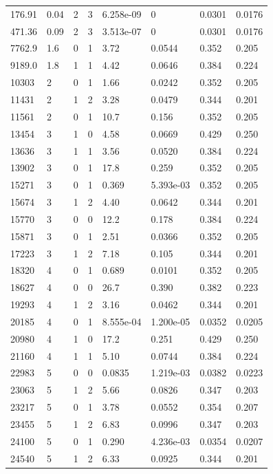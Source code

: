 \documentclass[preview]{standalone}
\begin{document}
{{\begin{tabular}{L{1.2cm}C{1.2cm} C{0.3cm}C{0.5cm} C{1.4cm}C{1.4cm} C{1.4cm}C{1.4cm}}
  176.91  &  0.04  & 2     &  3 &  6.258e-09  & 0  & 0.0301 &  0.0176   \\ 
  471.36  &  0.09  & 2     &  3 &  3.513e-07  & 0  & 0.0301 &  0.0176   \\ 
  7762.9  &   1.6  & 0     &  1 &  3.72  & 0.0544  & 0.352 &  0.205   \\ 
  9189.0  &   1.8  & 1     &  1 &  4.42  & 0.0646  & 0.384 &  0.224   \\ 
  10303  &     2  & 0     &  1 &  1.66  & 0.0242  & 0.352 &  0.205   \\ 
  11431  &     2  & 1     &  2 &  3.28  & 0.0479  & 0.344 &  0.201   \\ 
  11561  &     2  & 0     &  1 &  10.7  & 0.156  & 0.352 &  0.205   \\ 
  13454  &     3  & 1     &  0 &  4.58  & 0.0669  & 0.429 &  0.250   \\ 
  13636  &     3  & 1     &  1 &  3.56  & 0.0520  & 0.384 &  0.224   \\ 
  13902  &     3  & 0     &  1 &  17.8  & 0.259  & 0.352 &  0.205   \\ 
  15271  &     3  & 0     &  1 &  0.369  & 5.393e-03  & 0.352 &  0.205   \\ 
  15674  &     3  & 1     &  2 &  4.40  & 0.0642  & 0.344 &  0.201   \\ 
  15770  &     3  & 0     &  0 &  12.2  & 0.178  & 0.384 &  0.224   \\ 
  15871  &     3  & 0     &  1 &  2.51  & 0.0366  & 0.352 &  0.205   \\ 
  17223  &     3  & 1     &  2 &  7.18  & 0.105  & 0.344 &  0.201   \\ 
  18320  &     4  & 0     &  1 &  0.689  & 0.0101  & 0.352 &  0.205   \\ 
  18627  &     4  & 0     &  0 &  26.7  & 0.390  & 0.382 &  0.223   \\ 
  19293  &     4  & 1     &  2 &  3.16  & 0.0462  & 0.344 &  0.201   \\ 
  20185  &     4  & 0     &  1 &  8.555e-04  & 1.200e-05  & 0.0352 &  0.0205   \\ 
  20980  &     4  & 1     &  0 &  17.2  & 0.251  & 0.429 &  0.250   \\ 
  21160  &     4  & 1     &  1 &  5.10  & 0.0744  & 0.384 &  0.224   \\ 
  22983  &     5  & 0     &  0 &  0.0835  & 1.219e-03  & 0.0382 &  0.0223   \\ 
  23063  &     5  & 1     &  2 &  5.66  & 0.0826  & 0.347 &  0.203   \\ 
  23217  &     5  & 0     &  1 &  3.78  & 0.0552  & 0.354 &  0.207   \\ 
  23455  &     5  & 1     &  2 &  6.83  & 0.0996  & 0.347 &  0.203   \\ 
  24100  &     5  & 0     &  1 &  0.290  & 4.236e-03  & 0.0354 &  0.0207   \\ 
  24540  &     5  & 1     &  2 &  6.33  & 0.0925  & 0.344 &  0.201   \\ 
\hline 
\end{tabular} 

}}
\end{document}

